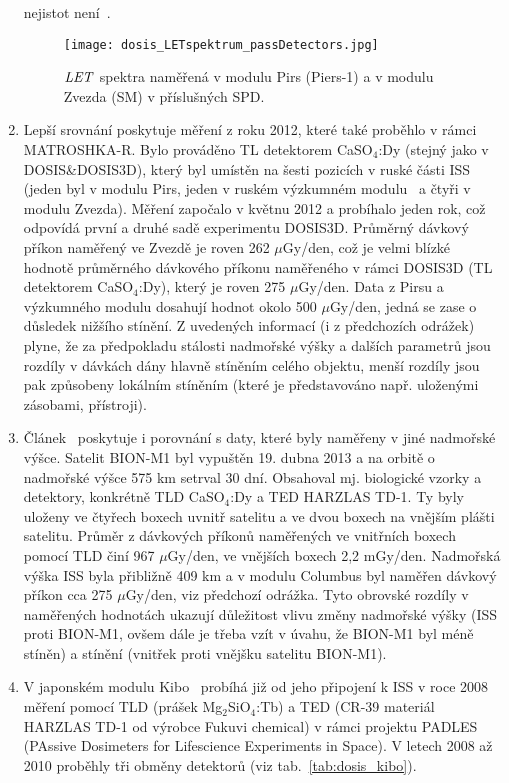 \begin{enumerate}
nejistot není~\cite{passDetectors}.
\begin{figure}[h]
  \centering
  \texttt{[image: dosis\_LETspektrum\_passDetectors.jpg]}
  \caption{$\mathit{LET}$ spektra naměřená v modulu Pirs (Piers-1) a v modulu Zvezda (SM) v příslušných SPD.~\cite{passDetectors}}
  \label{fig:dosis_passDetectors_LETspektrum}
\end{figure}
\item Lepší srovnání poskytuje měření z roku 2012, které také proběhlo v rámci MATROSHKA-R. Bylo prováděno TL detektorem CaSO$_4$:Dy (stejný jako v DOSIS\&DOSIS3D), který byl umístěn na šesti pozicích v ruské části ISS (jeden byl v modulu Pirs, jeden v ruském výzkumném modulu~\cite{researchModule} a čtyři v modulu Zvezda). Měření započalo v květnu 2012 a probíhalo jeden rok, což odpovídá první a druhé sadě experimentu DOSIS3D. Průměrný dávkový příkon naměřený ve Zvezdě je roven 262 $\mu$Gy/den, což je velmi blízké hodnotě průměrného dávkového příkonu naměřeného v rámci DOSIS3D (TL detektorem CaSO$_4$:Dy), který je roven 275 $\mu$Gy/den. Data z Pirsu a výzkumného modulu dosahují hodnot okolo 500 $\mu$Gy/den, jedná se zase o důsledek nižšího stínění. Z uvedených informací (i z předchozích odrážek) plyne, že za předpokladu
  stálosti nadmořské výšky a dalších parametrů jsou rozdíly v dávkách dány hlavně stíněním celého objektu, menší rozdíly jsou pak způsobeny lokálním stíněním (které je představováno např. uloženými zásobami, přístroji).~\cite{ambrozova_dvaExperimenty}
  \item Článek~\cite{ambrozova_dvaExperimenty} poskytuje i porovnání s daty, které byly naměřeny v jiné nadmořské výšce. Satelit BION-M1 byl vypuštěn 19. dubna 2013 a na orbitě o nadmořské výšce 575 km setrval 30 dní. Obsahoval mj. biologické vzorky a detektory, konkrétně TLD CaSO$_4$:Dy a TED HARZLAS TD-1. Ty byly uloženy ve čtyřech boxech uvnitř satelitu a ve dvou boxech na vnějším plášti satelitu. Průměr z dávkových příkonů naměřených ve vnitřních boxech pomocí TLD činí 967 $\mu$Gy/den, ve vnějších boxech 2,2 mGy/den. Nadmořská výška ISS byla přibližně 409 km a v modulu Columbus byl naměřen dávkový příkon cca 275 $\mu$Gy/den, viz předchozí odrážka. Tyto obrovské rozdíly v naměřených hodnotách ukazují důležitost vlivu změny nadmořské výšky (ISS proti BION-M1, ovšem dále je třeba vzít
	v úvahu, že BION-M1 byl méně stíněn) a stínění (vnitřek proti vnějšku satelitu BION-M1).
  \item V japonském modulu Kibo~\cite{kibo} probíhá již od jeho připojení k ISS v roce 2008 měření pomocí TLD (prášek Mg$_2$SiO$_4$:Tb) a TED (CR-39 materiál HARZLAS TD-1 od výrobce Fukuvi chemical) v rámci projektu PADLES (PAssive Dosimeters for Lifescience Experiments in Space). V letech 2008 až 2010 proběhly tři obměny detektorů (viz tab.~\ref{tab:dosis_kibo}).

\end{enumerate}
